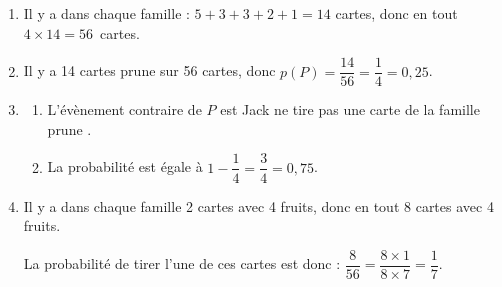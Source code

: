 
\medskip

%
%
%

\medskip

\begin{enumerate}
\item %
Il y a dans chaque famille : $5 + 3 + 3 + 2 + 1 = 14$ cartes, donc en tout $4 \times 14 = 56$~cartes.


\item %
Il y a 14 cartes prune sur 56 cartes, donc $p(P) = \dfrac{14}{56} = \dfrac14 = 0,25$.
\item 
	\begin{enumerate}
		\item %
L'évènement contraire de $P$ est \og Jack ne tire pas une carte de la famille prune \fg.
		\item %
		La probabilité est égale à $1 - \dfrac14 = \dfrac34 = 0,75$.
	\end{enumerate}	
\item %
Il y a dans chaque famille 2 cartes avec 4 fruits, donc en tout 8 cartes avec 4 fruits.

La probabilité de tirer l'une de ces cartes est donc : $\dfrac{8}{56} = \dfrac{8 \times 1}{8 \times 7} = \dfrac{1}{7}$.
\end{enumerate}

\bigskip

